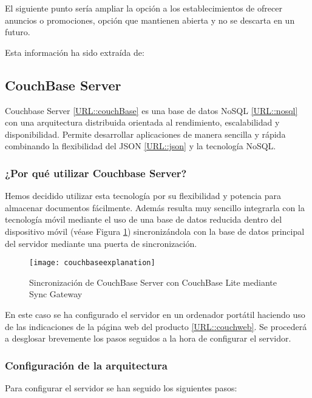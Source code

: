 El siguiente punto sería ampliar la opción a los establecimientos de ofrecer anuncios o promociones, opción que mantienen abierta y no se descarta en un futuro.


Esta información ha sido extraída de: \cite{URL::Articulo} 

\subsection{CouchBase Server}

Couchbase Server \ref{URL::couchBase} es una base de datos NoSQL \ref{URL::nosql} con una arquitectura distribuida orientada al rendimiento, escalabilidad y disponibilidad. Permite desarrollar aplicaciones de manera sencilla y rápida combinando la flexibilidad del JSON \ref{URL::json} y la tecnología NoSQL.

\subsubsection{¿Por qué utilizar Couchbase Server?}

Hemos decidido utilizar esta tecnología por su flexibilidad y potencia para almacenar documentos fácilmente. Además resulta muy sencillo integrarla con la tecnología móvil mediante el uso de una base de datos reducida dentro del dispositivo móvil (véase Figura \ref{fig:couchbaseexplanation}) sincronizándola con la base de datos principal del servidor mediante una puerta de sincronización.

\begin{figure}[H]
	\centering
	\texttt{[image: couchbaseexplanation]}
	\caption{Sincronización de CouchBase Server con CouchBase Lite mediante Sync Gateway}
	\label{fig:couchbaseexplanation}
\end{figure}

En este caso se ha configurado el servidor en un ordenador portátil haciendo uso de las indicaciones de la página web del producto \ref{URL::couchweb}. Se procederá a desglosar brevemente los pasos seguidos a la hora de configurar el servidor.


\subsubsection{Configuración de la arquitectura}

Para configurar el servidor se han seguido los siguientes pasos: 


